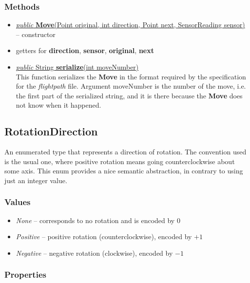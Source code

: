 \documentclass{article}
\newcommand{\method}[4]{\underline{\textit{#1} #2 \textbf{#3}(#4)}}
\begin{document}
\subsubsection*{Methods}

\begin{itemize}
\item \underline{\textit{public} \textbf{Move}(Point original, int direction, Point next, SensorReading sensor)} -- constructor
\item getters for \textbf{direction}, \textbf{sensor}, \textbf{original}, \textbf{next}
\item \method{public}{String}{serialize}{int moveNumber} \\
  This function serializes the \textbf{Move} in the format required by the specification for the \textit{flightpath} file. Argument moveNumber is the number of the move, i.e. the first part of the serialized string, and it is there because the \textbf{Move} does not know when it happened.
\end{itemize}

\subsection{RotationDirection}
\label{cls:RotationDirection}

An enumerated type that represents a direction of rotation. The convention used is the usual one, where positive rotation means going counterclockwise about some axis. This enum provides a nice semantic abstraction, in contrary to using just an integer value.

\subsubsection*{Values}

\begin{itemize}
\item \textit{None} -- corresponds to no rotation and is encoded by $0$
\item \textit{Positive} -- positive rotation (counterclockwise), encoded by $+1$
\item \textit{Negative} -- negative rotation (clockwise), encoded by $-1$
\end{itemize}

\subsubsection*{Properties}
\end{document}
